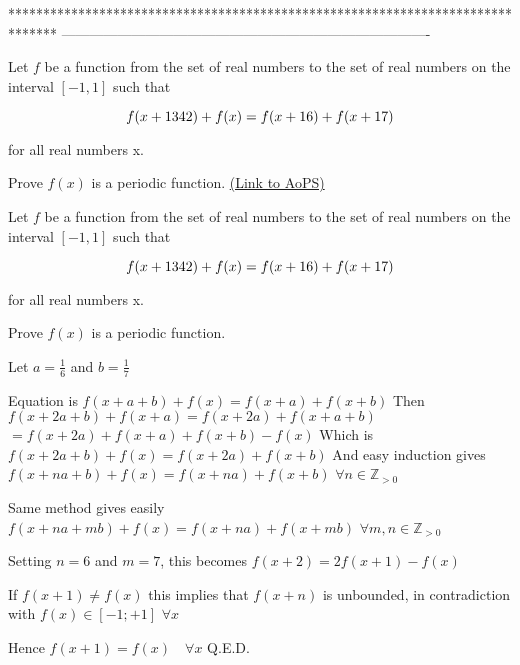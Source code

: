 *******************************************************************************
-------------------------------------------------------------------------------

\begin{problem}
	Let $f$ be a function from the set of real numbers to the set of real numbers on the interval $[-1,1]$ such that

$$f(x+13\/42)+f(x)=f(x+1\/6)+f(x+1\/7)$$

for all real numbers x.

Prove $f(x)$ is a periodic function.
	\flushright \href{https://artofproblemsolving.com/community/c6h1630265}{(Link to AoPS)}
\end{problem}



\begin{solution}
	\begin{tcolorbox}Let $f$ be a function from the set of real numbers to the set of real numbers on the interval $[-1,1]$ such that

$$f(x+13\/42)+f(x)=f(x+1\/6)+f(x+1\/7)$$

for all real numbers x.

Prove $f(x)$ is a periodic function.\end{tcolorbox}
Let $a=\frac 16$ and $b=\frac 17$

Equation is $f(x+a+b)+f(x)=f(x+a)+f(x+b)$
Then $f(x+2a+b)+f(x+a)=f(x+2a)+f(x+a+b)$ $=f(x+2a)+f(x+a)+f(x+b)-f(x)$
Which is $f(x+2a+b)+f(x)=f(x+2a)+f(x+b)$
And easy induction gives $f(x+na+b)+f(x)=f(x+na)+f(x+b)$ $\forall n\in\mathbb Z_{>0}$

Same method gives easily $f(x+na+mb)+f(x)=f(x+na)+f(x+mb)$ $\forall m,n\in\mathbb Z_{>0}$

Setting $n=6$ and $m=7$, this becomes $f(x+2)=2f(x+1)-f(x)$

If $f(x+1)\ne f(x)$ this implies that $f(x+n)$ is unbounded, in contradiction with $f(x)\in[-1;+1]$ $\forall x$

Hence $\boxed{f(x+1)=f(x)\quad\forall x}$
Q.E.D.


\end{solution}



